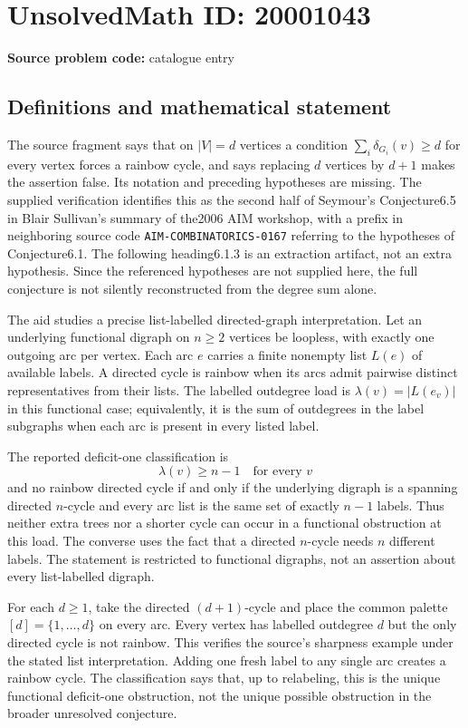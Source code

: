 \documentclass[11pt]{article}
\begin{document}
\section*{UnsolvedMath ID: 20001043}
\textbf{Source problem code:} catalogue entry
\subsection{Definitions and mathematical statement}
The source fragment says that on $|V|=d$ vertices a condition $\sum_i\delta_{G_i}(v)\geq d$ for every vertex forces a rainbow cycle, and says replacing $d$ vertices by $d+1$ makes the assertion false. Its notation and preceding hypotheses are missing. The supplied verification identifies this as the second half of Seymour's Conjecture6.5 in Blair Sullivan's summary of the2006 AIM workshop, with a prefix in neighboring source code \texttt{AIM-COMBINATORICS-0167} referring to the hypotheses of Conjecture6.1. The following heading6.1.3 is an extraction artifact, not an extra hypothesis. Since the referenced hypotheses are not supplied here, the full conjecture is not silently reconstructed from the degree sum alone.

The aid studies a precise list-labelled directed-graph interpretation. Let an underlying functional digraph on $n\geq2$ vertices be loopless, with exactly one outgoing arc per vertex. Each arc $e$ carries a finite nonempty list $L(e)$ of available labels. A directed cycle is rainbow when its arcs admit pairwise distinct representatives from their lists. The labelled outdegree load is $\lambda(v)=|L(e_v)|$ in this functional case; equivalently, it is the sum of outdegrees in the label subgraphs when each arc is present in every listed label.

The reported deficit-one classification is
\[
 \lambda(v)\geq n-1\quad\text{for every }v
\]
and no rainbow directed cycle if and only if the underlying digraph is a spanning directed $n$-cycle and every arc list is the same set of exactly $n-1$ labels. Thus neither extra trees nor a shorter cycle can occur in a functional obstruction at this load. The converse uses the fact that a directed $n$-cycle needs $n$ different labels. The statement is restricted to functional digraphs, not an assertion about every list-labelled digraph.

For each $d\geq1$, take the directed $(d+1)$-cycle and place the common palette $[d]=\{1,\ldots,d\}$ on every arc. Every vertex has labelled outdegree $d$ but the only directed cycle is not rainbow. This verifies the source's sharpness example under the stated list interpretation. Adding one fresh label to any single arc creates a rainbow cycle. The classification says that, up to relabeling, this is the unique functional deficit-one obstruction, not the unique possible obstruction in the broader unresolved conjecture.
\end{document}
